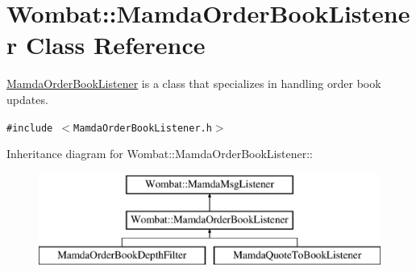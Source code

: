 \hypertarget{classWombat_1_1MamdaOrderBookListener}{
\section{Wombat::Mamda\-Order\-Book\-Listener Class Reference}
\label{classWombat_1_1MamdaOrderBookListener}
}
\hyperlink{classWombat_1_1MamdaOrderBookListener}{Mamda\-Order\-Book\-Listener} is a class that specializes in handling order book updates.  


{\tt \#include $<$Mamda\-Order\-Book\-Listener.h$>$}

Inheritance diagram for Wombat::Mamda\-Order\-Book\-Listener::\begin{figure}[H]
\begin{center}
\leavevmode
\includegraphics[height=3cm]{classWombat_1_1MamdaOrderBookListener}
\end{center}
\end{figure}
